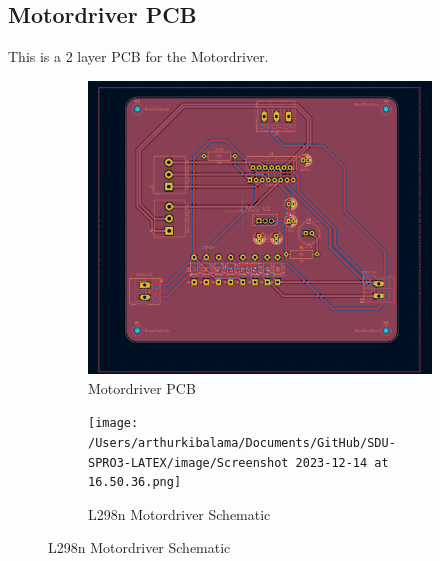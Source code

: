 \documentclass[../report.tex]{subfiles}
\begin{document}
\subsection{Motordriver PCB}
This is a 2 layer PCB for the Motordriver. 
\begin{figure}[H]
    \centering
    \begin{subfigure}[b]{0.4\linewidth}
      \includegraphics[width=\linewidth]{image/Screenshot 2023-12-14 at 16.22.46.png}
      \caption{Motordriver PCB} 
    \end{subfigure}
    \begin{subfigure}[b]{0.4\linewidth}
      \texttt{[image: /Users/arthurkibalama/Documents/GitHub/SDU-SPRO3-LATEX/image/Screenshot 2023-12-14 at 16.50.36.png]}
      \caption{L298n Motordriver Schematic}
    \end{subfigure}




  \end{figure}
    
\end{document}

